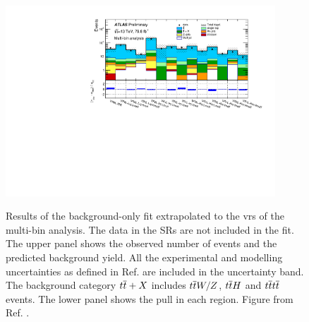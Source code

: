 \begin{figure}[htbp]
	\centering
	\includegraphics[width=0.9\textwidth]{figures/strong_prod/R21/multibin/histpull_grouping_VR.pdf}\\
	\caption{Results of the background-only fit extrapolated to the \glspl{vr} of the multi-bin analysis. 
	 The data in the  SRs are not included in the fit.  
	 The upper panel shows the observed number of events and the predicted background 
	yield. All the experimental and modelling uncertainties as defined in Ref. \cite{ATLAS-CONF-2018-041} are included in the uncertainty band. 
	The background 
	category $t\overline{t}+X$ includes $t\overline{t} W/Z$, $t\overline{t} H$ and $t\overline{t} t\overline{t}$ events. The lower panel shows the 
	pull in each region.
    Figure from Ref. \cite{ATLAS-CONF-2018-041}.	 }  
	\label{fig:pullVR_R21}
\end{figure}

